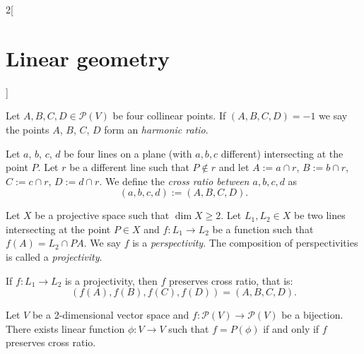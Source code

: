 \documentclass[../../../main.tex]{subfiles}
\begin{document}
\begin{multicols}{2}[\section{Linear geometry}]
  \begin{definition}
    Let $A,B,C,D\in\mathcal{P}(V)$ be four collinear points. If $(A,B,C,D)=-1$ we say the points $A$, $B$, $C$, $D$ form an \textit{harmonic ratio}.
  \end{definition}
  \begin{definition}
    Let $a$, $b$, $c$, $d$ be four lines on a plane (with $a,b,c$ different) intersecting at the point $P$. Let $r$ be a different line such that $P\notin r$ and let $A:=a\cap r$, $B:=b\cap r$, $C:=c\cap r$, $D:=d\cap r$. We define the \textit{cross ratio between $a,b,c,d$} as $$(a,b,c,d):=(A,B,C,D).$$
  \end{definition}
  \begin{definition}
    Let $X$ be a projective space such that $\dim X\geq 2$. Let $L_1,L_2\in X$ be two lines intersecting at the point $P\in X$ and $f:L_1\rightarrow L_2$ be a function such that $f(A)=L_2\cap PA$. We say $f$ is a \textit{perspectivity}. The composition of perspectivities is called a \textit{projectivity}.
  \end{definition}
  \begin{theorem}
    If $f:L_1\rightarrow L_2$ is a projectivity, then $f$ preserves cross ratio, that is: $$(f(A),f(B),f(C),f(D))=(A,B,C,D).$$
  \end{theorem}
  \begin{theorem}
    Let $V$ be a 2-dimensional vector space and $f:\mathcal{P}(V)\rightarrow \mathcal{P}(V)$ be a bijection. There exists linear function $\phi:V\rightarrow V$ such that $f=P(\phi)$ if and only if $f$ preserves cross ratio.
  \end{theorem}

\end{multicols}
\end{document}
